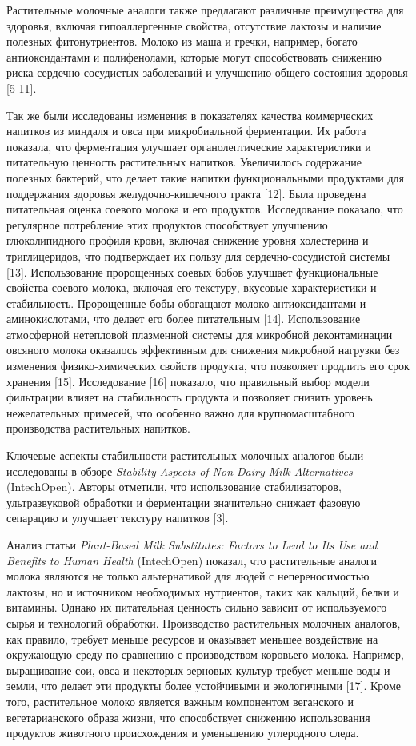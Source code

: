 Растительные молочные аналоги также предлагают различные преимущества
для здоровья, включая гипоаллергенные свойства, отсутствие лактозы и
наличие полезных фитонутриентов. Молоко из маша и гречки, например,
богато антиоксидантами и полифенолами, которые могут способствовать
снижению риска сердечно-сосудистых заболеваний и улучшению общего
состояния здоровья {[}5-11{]}.

Так же были исследованы изменения в показателях качества коммерческих
напитков из миндаля и овса при микробиальной ферментации. Их работа
показала, что ферментация улучшает органолептические характеристики и
питательную ценность растительных напитков. Увеличилось содержание
полезных бактерий, что делает такие напитки функциональными продуктами
для поддержания здоровья желудочно-кишечного тракта {[}12{]}. Была
проведена питательная оценка соевого молока и его продуктов.
Исследование показало, что регулярное потребление этих продуктов
способствует улучшению глюколипидного профиля крови, включая снижение
уровня холестерина и триглицеридов, что подтверждает их пользу для
сердечно-сосудистой системы {[}13{]}. Использование пророщенных соевых
бобов улучшает функциональные свойства соевого молока, включая его
текстуру, вкусовые характеристики и стабильность. Пророщенные бобы
обогащают молоко антиоксидантами и аминокислотами, что делает его более
питательным {[}14{]}. Использование атмосферной нетепловой плазменной
системы для микробной деконтаминации овсяного молока оказалось
эффективным для снижения микробной нагрузки без изменения
физико-химических свойств продукта, что позволяет продлить его срок
хранения {[}15{]}. Исследование {[}16{]} показало, что правильный выбор
модели фильтрации влияет на стабильность продукта и позволяет снизить
уровень нежелательных примесей, что особенно важно для крупномасштабного
производства растительных напитков.

Ключевые аспекты стабильности растительных молочных аналогов были
исследованы в обзоре \emph{Stability Aspects of Non-Dairy Milk
Alternatives} (IntechOpen). Авторы отметили, что использование
стабилизаторов, ультразвуковой обработки и ферментации значительно
снижает фазовую сепарацию и улучшает текстуру напитков {[}3{]}.

Анализ статьи \emph{Plant-Based Milk Substitutes: Factors to Lead to Its
Use and Benefits to Human Health} (IntechOpen) показал, что растительные
аналоги молока являются не только альтернативой для людей с
непереносимостью лактозы, но и источником необходимых нутриентов, таких
как кальций, белки и витамины. Однако их питательная ценность сильно
зависит от используемого сырья и технологий обработки. Производство
растительных молочных аналогов, как правило, требует меньше ресурсов и
оказывает меньшее воздействие на окружающую среду по сравнению с
производством коровьего молока. Например, выращивание сои, овса и
некоторых зерновых культур требует меньше воды и земли, что делает эти
продукты более устойчивыми и экологичными {[}17{]}. Кроме того,
растительное молоко является важным компонентом веганского и
вегетарианского образа жизни, что способствует снижению использования
продуктов животного происхождения и уменьшению углеродного следа.

